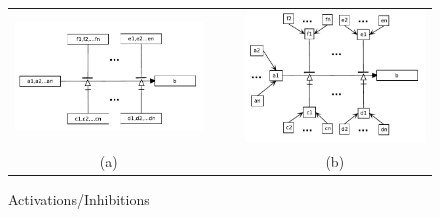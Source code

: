 \documentclass[a4paper]{article}
\begin{document}
\begin{figure}[htb]
\begin{center}
\begin{tabular}{ccc}
    \includegraphics[scale=0.5]{actinh-notitle.pdf} &~~&
\includegraphics[scale=0.5]{actinh2.pdf} \\
(a) && (b)
\end{tabular}
\end{center}
\caption{Activations/Inhibitions}
\label{fig:actinh}
\end{figure}
\end{document}
